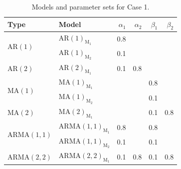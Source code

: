 \documentclass[12pt,a4paper]{article}
\begin{document}
	\begin{table}[H]
		\centering
		\begin{tabular}{llrrrr}
			\toprule
			\textbf{Type} & \textbf{Model} & $\alpha_1$ & $\alpha_2$ & $\beta_1$ & $\beta_2$ \\
			\midrule
			\multirow{2}{*}{$\mathrm{AR}(1)$}   
			& $\mathrm{AR}(1)_{\mathrm{M}_1}$ & 0.8 &        &        &        \\
			& $\mathrm{AR}(1)_{\mathrm{M}_2}$ & 0.1 &        &        &        \\
			\midrule
			\multirow{1}{*}{$\mathrm{AR}(2)$}  
			& $\mathrm{AR}(2)_{\mathrm{M}_1}$ & 0.1 & 0.8    &        &        \\
			\midrule
			\multirow{2}{*}{$\mathrm{MA}(1)$}   
			& $\mathrm{MA}(1)_{\mathrm{M}_1}$ &      &        & 0.8    &        \\
			& $\mathrm{MA}(1)_{\mathrm{M}_2}$ &      &        & 0.1    &        \\
			\midrule
			\multirow{1}{*}{$\mathrm{MA}(2)$}   
			& $\mathrm{MA}(2)_{\mathrm{M}_1}$ &      &        & 0.1    & 0.8    \\
			\midrule
			\multirow{2}{*}{$\mathrm{ARMA}(1,1)$} 
			& $\mathrm{ARMA}(1,1)_{\mathrm{M}_1}$ & 0.8 &        & 0.8    &        \\
			& $\mathrm{ARMA}(1,1)_{\mathrm{M}_2}$ & 0.1 &        & 0.1    &        \\
			\midrule
			\multirow{1}{*}{$\mathrm{ARMA}(2,2)$} 
			& $\mathrm{ARMA}(2,2)_{\mathrm{M}_1}$ & 0.1 & 0.8    & 0.1    & 0.8    \\
			\bottomrule
		\end{tabular}
		\caption{Models and parameter sets for Case 1.}
		\label{tab:case1}
	\end{table}
	
\end{document}
